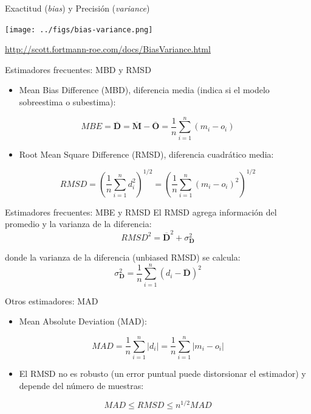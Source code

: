 \documentclass[aspectratio=169, usenames,svgnames,dvipsnames]{beamer}
\begin{document}
\begin{frame}[label={sec:org5ead824}]{Exactitud (\emph{bias}) y Precisión (\emph{variance})}
\begin{center}
\texttt{[image: ../figs/bias-variance.png]}
\end{center}

\url{http://scott.fortmann-roe.com/docs/BiasVariance.html}
\end{frame}

\begin{frame}[label={sec:org79d5147}]{Estimadores frecuentes: MBD y RMSD}
\begin{itemize}
\item Mean Bias Difference (MBD), diferencia media (indica si el modelo sobreestima o subestima):
\end{itemize}
\[
MBE = \overline{\mathbf{D}} = \overline{\mathbf{M}} - \overline{\mathbf{O}} = \frac{1}{n} \sum_{i=1}^n (m_i - o_i)
\]

\begin{itemize}
\item Root Mean Square Difference (RMSD), diferencia cuadrático media:
\end{itemize}
\[
RMSD = \left(\frac{1}{n} \sum_{i=1}^n d_i^2 \right)^{1/2} =  \left( \frac{1}{n} \sum_{i=1}^n (m_i - o_i)^2  \right)^{1/2}
\]
\end{frame}

\begin{frame}[label={sec:orge283337}]{Estimadores frecuentes: MBE y RMSD}
El RMSD agrega información del promedio y la varianza de la
  diferencia:
\[
RMSD^2= \overline{\mathbf{D}}^2 + \sigma^2_{\mathbf{D}} 
\]

donde la varianza de la diferencia (unbiased RMSD) se calcula:
\[
\sigma^2_{\mathbf{D}} = \frac{1}{n} \sum_{i=1}^n (d_i - \overline{\mathbf{D}})^2
\]
\end{frame}


\begin{frame}[label={sec:org419959d}]{Otros estimadores: MAD}
\begin{itemize}
\item Mean Absolute Deviation (MAD):
\end{itemize}

\[
MAD = \frac{1}{n} \sum_{i=1}^n \left|d_i\right| =  \frac{1}{n} \sum_{i=1}^n \left|m_i - o_i\right|
\]
\begin{itemize}
\item El RMSD no es robusto (un error puntual puede distorsionar el estimador) y depende del número de muestras:
\end{itemize}
\[
MAD \leq RMSD \leq n^{1/2} MAD
\]

\nocite{Willmott.Matsuura.ea2009, Willmott.Matsuura2005a}
\end{frame}
\end{document}
